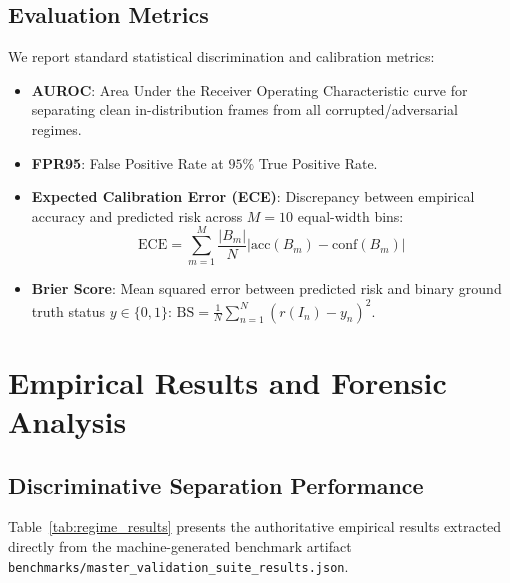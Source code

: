 \documentclass[10pt,journal,compsoc]{IEEEtran}
\begin{document}
\subsection{Evaluation Metrics}
We report standard statistical discrimination and calibration metrics:
\begin{itemize}
    \item \textbf{AUROC}: Area Under the Receiver Operating Characteristic curve for separating clean in-distribution frames from all corrupted/adversarial regimes.
    \item \textbf{FPR95}: False Positive Rate at $95\%$ True Positive Rate.
    \item \textbf{Expected Calibration Error (ECE)}: Discrepancy between empirical accuracy and predicted risk across $M=10$ equal-width bins:
    \begin{equation}
    \text{ECE} = \sum_{m=1}^M \frac{|B_m|}{N} \left| \text{acc}(B_m) - \text{conf}(B_m) \right|
    \end{equation}
    \item \textbf{Brier Score}: Mean squared error between predicted risk and binary ground truth status $y \in \{0, 1\}$: $\text{BS} = \frac{1}{N} \sum_{n=1}^N (r(I_n) - y_n)^2$.
\end{itemize}

\section{Empirical Results and Forensic Analysis}

\subsection{Discriminative Separation Performance}
Table~\ref{tab:regime_results} presents the authoritative empirical results extracted directly from the machine-generated benchmark artifact \texttt{benchmarks/master\_validation\_suite\_results.json}.
\end{document}
